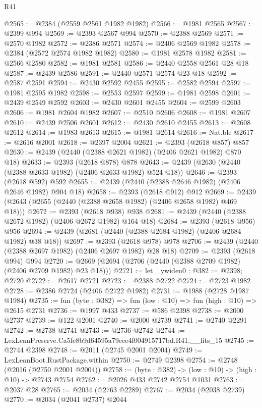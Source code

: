 \begin{lexlean}{R41}
\begin{coremodule}
@2565 := @2384 (@2559 @2561 @1982 @1982)
@2566 := @1981 @2565
@2567 := @2399 @994
@2569 := @2393 @2567 @994
@2570 := @2388 @2569
@2571 := @2570 @1982
@2572 := @2386 @2571
@2574 := @2406 @2569 @1982
@2578 := @2384 (@2572 @2574 @1982 @1982)
@2580 := @1981 @2578 @1982
@2581 := @2566 @2580
@2582 := @1981 @2581
@2586 := @2440 @2558 @2561 @28 @18
@2587 := @2439 @2586
@2591 := @2440 @2571 @2574 @23 @18
@2592 := @2587 @2591
@2594 := @2430 @2592 @2455
@2595 := @2582 @2594
@2597 := @1981 @2595 @1982
@2598 := @2553 @2597
@2599 := @1981 @2598
@2601 := @2439 @2549 @2592
@2603 := @2430 @2601 @2455
@2604 := @2599 @2603
@2606 := @1981 @2604 @1982
@2607 := @2510 @2606
@2608 := @1981 @2607
@2610 := @2439 @2506 @2601
@2612 := @2430 @2610 @2455
@2613 := @2608 @2612
@2614 := @1983 @2613
@2615 := @1981 @2614
@2616 := Nat.ble
@2617 := @2616 @2001
@2618 := @2397 @2004
@2621 := @2393 (@2618 @857) @857
@2630 := @2439 (@2440 (@2388 @2621 @1982) (@2406 @2621 @1982) @870 @18)
@2633 := @2393 (@2618 @878) @878
@2643 := @2439 (@2630 (@2440 (@2388 @2633 @1982) (@2406 @2633 @1982) @524 @18))
@2646 := @2393 (@2618 @592) @592
@2655 := @2439 (@2440 (@2388 @2646 @1982) (@2406 @2646 @1982) @904 @18)
@2658 := @2393 (@2618 @912) @912
@2669 := @2439 (@2643 (@2655 (@2440 (@2388 @2658 @1982) (@2406 @2658 @1982) @469 @18)))
@2672 := @2393 (@2618 @938) @938
@2681 := @2439 (@2440 (@2388 @2672 @1982) (@2406 @2672 @1982) @164 @18)
@2684 := @2393 (@2618 @956) @956
@2694 := @2439 (@2681 (@2440 (@2388 @2684 @1982) (@2406 @2684 @1982) @38 @18))
@2697 := @2393 (@2618 @978) @978
@2706 := @2439 (@2440 (@2388 @2697 @1982) (@2406 @2697 @1982) @28 @18)
@2709 := @2393 (@2618 @994) @994
@2720 := @2669 (@2694 (@2706 (@2440 (@2388 @2709 @1982) (@2406 @2709 @1982) @23 @18)))
@2721 := let _ywiden0 : @382 := @2398; @2720
@2722 := @2617 @2721
@2723 := @2388 @2722
@2724 := @2723 @1982
@2728 := @2386 @2724 (@2406 @2722 @1982)
@2731 := @1988 (@2728 @1987 @1984)
@2735 := fun (byte : @382) => fun (low : @10) => fun (high : @10) => @2615 @2731
@2736 := @1997 @433
@2737 := @586 @2398
@2738 := @2000 @2737
@2739 := @122 @2001
@2740 := @2000 @2739
@2741 := @2740 @2291
@2742 := @2738 @2741
@2743 := @2736 @2742
@2744 := LexLeanPreserve.Ca5fe8b9d64595a79eee4f004915717bd.R41.__fits_15
@2745 := @2744 @2398
@2748 := @2011 (@2745 @2001 @2004)
@2749 := LexLeanBoot.RustPackage.within
@2750 := @2749 @2398
@2754 := @2748 (@2016 (@2750 @2001 @2004))
@2758 := (byte : @382) -> (low : @10) -> (high : @10) -> @2743 @2754
@2762 := @2026 @433 @2742 @2754 @1031
@2763 := @2037 @28
@2765 := @2034 (@2763 @2289)
@2767 := @2034 (@2038 @2739)
@2770 := @2034 (@2041 @2737) @2044

\end{coremodule}
\end{lexlean}
